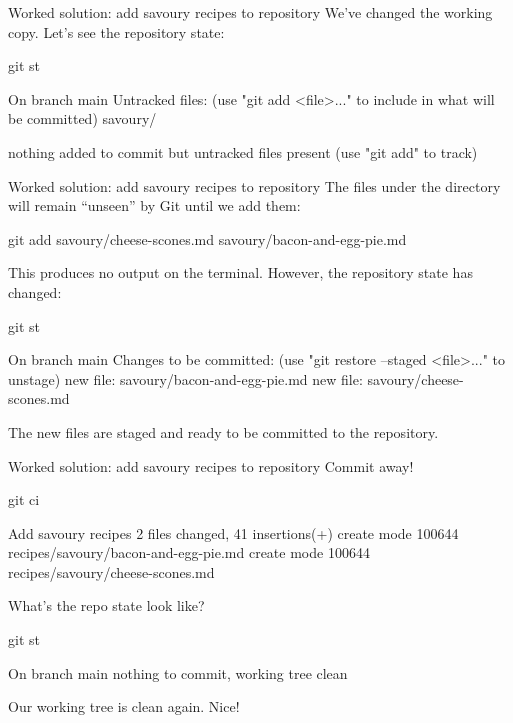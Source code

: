 \begin{frame}[fragile]{Worked solution: add savoury recipes to repository}
    We've changed the working copy.  Let's see the repository state:
    \begin{shellcode}
        git st
    \end{shellcode}
    \begin{outputcode}
On branch main
Untracked files:
  (use "git add <file>..." to include in what will be committed)
        savoury/

nothing added to commit but untracked files present (use "git add" to track)
    \end{outputcode}
\end{frame}

\begin{frame}[fragile]{Worked solution: add savoury recipes to repository}
    The files under the  directory will remain ``unseen'' by
    Git until we add them:
    \begin{shellcode}
        git add savoury/cheese-scones.md savoury/bacon-and-egg-pie.md
    \end{shellcode}

    This produces no output on the terminal.  However, the repository state
    has changed:
    \begin{shellcode}
        git st
    \end{shellcode}
    \begin{outputcode}
On branch main
Changes to be committed:
  (use "git restore --staged <file>..." to unstage)
        new file:   savoury/bacon-and-egg-pie.md
        new file:   savoury/cheese-scones.md
    \end{outputcode}

    The new files are staged and ready to be committed to the repository.
\end{frame}

\begin{frame}[fragile]{Worked solution: add savoury recipes to repository}
    Commit away!
    \begin{shellcode}
        git ci
    \end{shellcode}
    \begin{outputcode}
[main 586c856] Add savoury recipes
 2 files changed, 41 insertions(+)
 create mode 100644 recipes/savoury/bacon-and-egg-pie.md
 create mode 100644 recipes/savoury/cheese-scones.md
    \end{outputcode}

    What's the repo state look like?
    \begin{shellcode}
        git st
    \end{shellcode}
    \begin{outputcode}
On branch main
nothing to commit, working tree clean
    \end{outputcode}
    Our working tree is clean again.  Nice!
\end{frame}

